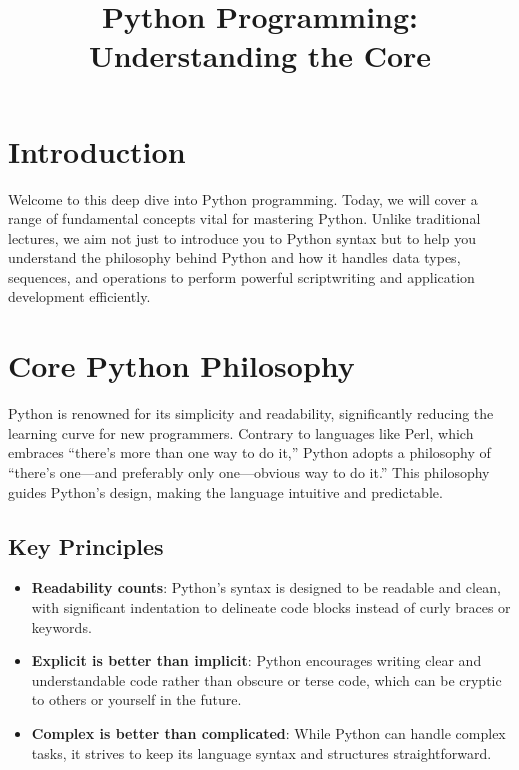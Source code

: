 \documentclass{article}
\title{Python Programming: Understanding the Core}
\date{}
\begin{document}
\maketitle
\tableofcontents
\newpage

\section{Introduction}

Welcome to this deep dive into Python programming. Today, we will cover a range of fundamental concepts vital for mastering Python. Unlike traditional lectures, we aim not just to introduce you to Python syntax but to help you understand the philosophy behind Python and how it handles data types, sequences, and operations to perform powerful scriptwriting and application development efficiently.

\section{Core Python Philosophy}

Python is renowned for its simplicity and readability, significantly reducing the learning curve for new programmers. Contrary to languages like Perl, which embraces ``there's more than one way to do it,'' Python adopts a philosophy of ``there's one—and preferably only one—obvious way to do it.'' This philosophy guides Python’s design, making the language intuitive and predictable.

\subsection{Key Principles}

\begin{itemize}
    \item \textbf{Readability counts}: Python’s syntax is designed to be readable and clean, with significant indentation to delineate code blocks instead of curly braces or keywords.
    \item \textbf{Explicit is better than implicit}: Python encourages writing clear and understandable code rather than obscure or terse code, which can be cryptic to others or yourself in the future.
    \item \textbf{Complex is better than complicated}: While Python can handle complex tasks, it strives to keep its language syntax and structures straightforward.
\end{itemize}
\end{document}
